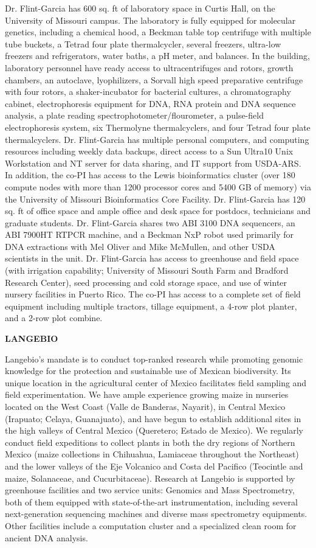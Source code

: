 Dr. Flint-Garcia has 600 sq. ft of laboratory space in Curtis Hall, on the University of Missouri campus.  The laboratory is fully equipped for molecular genetics, including a chemical hood, a Beckman table top centrifuge with multiple tube buckets, a Tetrad four plate thermalcycler, several freezers, ultra-low freezers and refrigerators, water baths, a pH meter, and balances.  In the building, laboratory personnel have ready access to ultracentrifuges and rotors, growth chambers, an autoclave, lyophilizers, a Sorvall high speed preparative centrifuge with four rotors, a shaker-incubator for bacterial cultures, a chromatography cabinet, electrophoresis equipment for DNA, RNA protein and DNA sequence analysis, a plate reading spectrophotometer/flourometer, a pulse-field electrophoresis system, six Thermolyne thermalcyclers, and four Tetrad four plate thermalcyclers. Dr. Flint-Garcia has multiple personal computers, and computing resources including weekly data backups, direct access to a Sun Ultra10 Unix Workstation and NT server for data sharing, and IT support from USDA-ARS.  In addition, the co-PI has access to the Lewis bioinformatics cluster (over 180 compute nodes with more than 1200 processor cores and 5400 GB of memory) via the University of Missouri Bioinformatics Core Facility. Dr. Flint-Garcia has 120 sq. ft of office space and ample office and desk space for postdocs, technicians and graduate students. Dr. Flint-Garcia shares two ABI 3100 DNA sequencers, an ABI 7900HT RTPCR machine, and a Beckman NxP robot used primarily for DNA extractions with Mel Oliver and Mike McMullen, and other USDA scientists in the unit. Dr. Flint-Garcia has access to greenhouse and field space (with irrigation capability; University of Missouri South Farm and Bradford Research Center), seed processing and cold storage space, and use of winter nursery facilities in Puerto Rico. The co-PI has access to a complete set of field equipment including multiple tractors, tillage equipment, a 4-row plot planter, and a 2-row plot combine. 

\textbf{LANGEBIO} 

Langebio's mandate is to conduct top-ranked research while promoting genomic knowledge for the protection and sustainable use of Mexican biodiversity. Its unique location in the agricultural center of Mexico facilitates field sampling and field experimentation. We have ample experience growing maize in nurseries located on the West Coast (Valle de Banderas, Nayarit), in Central Mexico (Irapuato; Celaya, Guanajuato), and have begun to establish additional sites in the high valleys of Central Mexico (Queretero; Estado de Mexico). We regularly conduct field expeditions to collect plants in both the dry regions of Northern Mexico (maize collections in Chihuahua, Lamiaceae throughout the Northeast) and the lower valleys of the Eje Volcanico and Costa del Pacifico (Teocintle and maize, Solanaceae, and Cucurbitaceae). Research at Langebio is supported by greenhouse facilities and two service units: Genomics and Mass Spectrometry, both of them equipped with state-of-the-art instrumentation, including several next-generation sequencing machines and diverse mass spectrometry equipments. Other facilities include a computation cluster and a specialized clean room for ancient DNA analysis.

